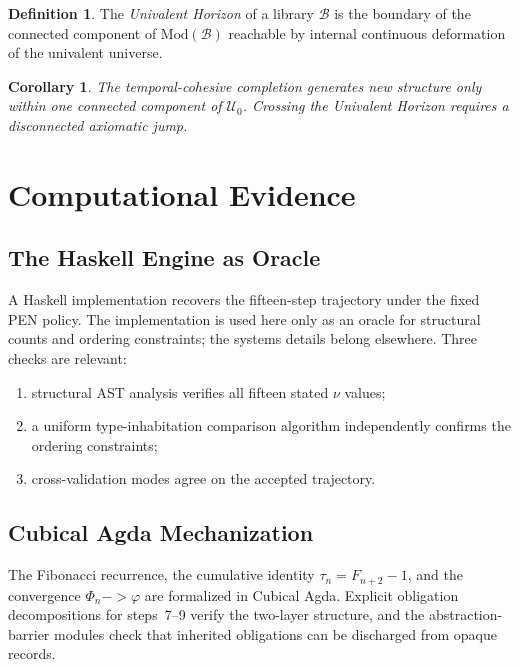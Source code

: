 \documentclass[11pt,a4paper]{article}
\def\to{->}%
\theoremstyle{plain}
\newtheorem{corollary}[theorem]{Corollary}
\theoremstyle{definition}
\newtheorem{definition}[theorem]{Definition}
\theoremstyle{remark}
\newcommand{\U}{\mathcal{U}}
\newcommand{\B}{\mathcal{B}}
\newcommand{\ModCat}{\mathrm{Mod}}
\begin{document}
\begin{definition}
\label{def:horizon}
The \emph{Univalent Horizon} of a library $\B$ is the boundary of the connected component of $\ModCat(\B)$ reachable by internal continuous deformation of the univalent universe.
\end{definition}

\begin{corollary}
\label{cor:horizon}
The temporal-cohesive completion generates new structure only within one connected component of $\U_0$.  Crossing the Univalent Horizon requires a disconnected axiomatic jump.
\end{corollary}

\section{Computational Evidence}
\label{sec:evidence}

\subsection{The Haskell Engine as Oracle}

A Haskell implementation recovers the fifteen-step trajectory under the fixed PEN policy.  The implementation is used here only as an oracle for structural counts and ordering constraints; the systems details belong elsewhere.  Three checks are relevant:
\begin{enumerate}[nosep]
    \item structural AST analysis verifies all fifteen stated $\nu$ values;
    \item a uniform type-inhabitation comparison algorithm independently confirms the ordering constraints;
    \item cross-validation modes agree on the accepted trajectory.
\end{enumerate}

\subsection{Cubical Agda Mechanization}

The Fibonacci recurrence, the cumulative identity $\tau_n=F_{n+2}-1$, and the convergence $\Phi_n\to\varphi$ are formalized in Cubical Agda.  Explicit obligation decompositions for steps~7--9 verify the two-layer structure, and the abstraction-barrier modules check that inherited obligations can be discharged from opaque records.
\end{document}
